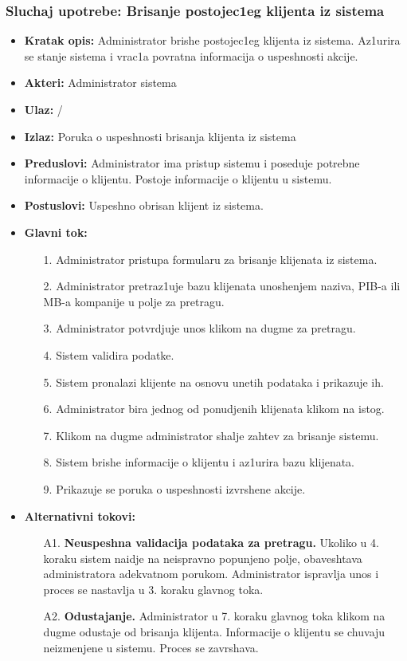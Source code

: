 \subsubsection{Sluchaj upotrebe: Brisanje postojec1eg klijenta iz sistema}

\begin{itemize}
\item{\textbf{Kratak opis:} Administrator brishe postojec1eg klijenta iz sistema. Az1urira se stanje sistema i vrac1a povratna informacija o uspeshnosti akcije.}
\item{\textbf{Akteri:} Administrator sistema}
\item{\textbf{Ulaz:} / }
\item{\textbf{Izlaz:} Poruka o uspeshnosti brisanja klijenta iz sistema }
\item{\textbf{Preduslovi:} Administrator ima pristup sistemu i poseduje potrebne informacije o klijentu. Postoje informacije o klijentu u sistemu.}
\item{\textbf{Postuslovi:} Uspeshno obrisan klijent iz sistema.}
\item{\textbf{Glavni tok:} 
\begin{enumerate}
    \item [1.] Administrator pristupa formularu za brisanje klijenata iz sistema.
    \item[2.] Administrator pretraz1uje bazu klijenata unoshenjem naziva, PIB-a ili MB-a kompanije u polje za pretragu.
    \item[3.] Administrator potvrdjuje unos klikom na dugme za pretragu.
    \item[4.] Sistem validira podatke.
    \item[5.] Sistem pronalazi klijente na osnovu unetih podataka i prikazuje ih.
    \item[6.] Administrator bira jednog od ponudjenih klijenata klikom na istog.
    \item[7.] Klikom na dugme administrator shalje zahtev za brisanje sistemu.
    \item[8.] Sistem brishe informacije o klijentu i az1urira bazu klijenata.
    \item[9.] Prikazuje se poruka o uspeshnosti izvrshene akcije.
\end{enumerate}

}
\item{\textbf{Alternativni tokovi:} 
\begin{enumerate}
    \item [A1.] \textbf{Neuspeshna validacija podataka za pretragu.} Ukoliko u 4. koraku sistem naidje na neispravno popunjeno polje, obaveshtava administratora adekvatnom porukom. Administrator ispravlja unos i proces se nastavlja u 3. koraku glavnog toka.
    \item[A2.] \textbf{Odustajanje.} Administrator u 7. koraku glavnog toka klikom na dugme odustaje od brisanja klijenta. Informacije o klijentu se chuvaju neizmenjene u sistemu. Proces se zavrshava.
\end{enumerate}
}
\end{itemize}

